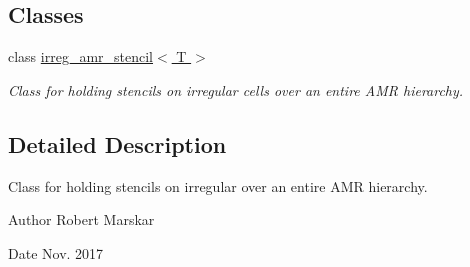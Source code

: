 \subsection*{Classes}
\begin{DoxyCompactItemize}
\item 
class \hyperlink{classirreg__amr__stencil}{irreg\+\_\+amr\+\_\+stencil$<$ T $>$}
\begin{DoxyCompactList}\small\item\em Class for holding stencils on irregular cells over an entire A\+MR hierarchy. \end{DoxyCompactList}\end{DoxyCompactItemize}


\subsection{Detailed Description}
Class for holding stencils on irregular over an entire A\+MR hierarchy. 

\begin{DoxyAuthor}{Author}
Robert Marskar 
\end{DoxyAuthor}
\begin{DoxyDate}{Date}
Nov. 2017 
\end{DoxyDate}
